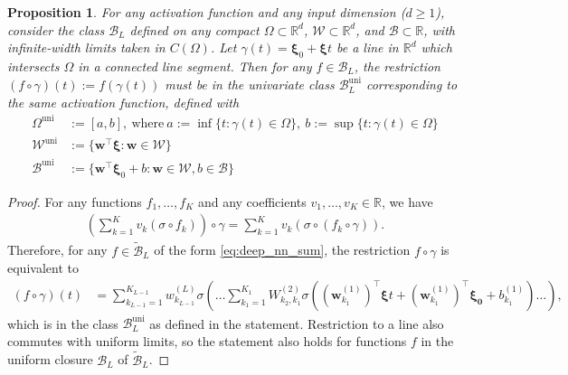 \documentclass[10pt,a4paper]{amsart}
\newtheorem{proposition}{Proposition}
\newcommand{\R}{\mathbb{R}}
\def\cB{{\mathcal{B}}}
\def\cW{{\mathcal{W}}}
\def\vw{{\bm{w}}}
\begin{document}
\begin{proposition} \label{prop:line_restriction}
    For any activation function and any input dimension ($d \geq 1$), consider the class $\cB_L$ defined on any compact $\Omega \subset \R^d$, $\cW \subset \R^d$, and $\cB \subset \R$, with infinite-width limits taken in $C(\Omega)$. Let $\gamma(t) = \boldsymbol{\xi}_0 + \boldsymbol{\xi} t$ be a line in $\R^d$ which intersects $\Omega$ in a connected line segment. Then for any $f \in \cB_L$, the restriction $(f \circ \gamma)(t) := f(\gamma(t))$ must be in the univariate class $\cB_L^{\mathrm{uni}}$ corresponding to the same activation function, defined with
    \begin{align}
        \Omega^{\mathrm{uni}} &:= [a,b], \  \mathrm{where} \ a := \inf\{ t: \gamma(t) \in \Omega \}, \ b := \sup \{ t: \gamma(t) \in \Omega \}  \\
        \cW^{\mathrm{uni}} &:= \{ \vw^\top \boldsymbol{\xi}: \vw \in \cW \} \\
        \cB^{\mathrm{uni}} &:= \{ \vw^\top \boldsymbol{\xi}_0+ b: \vw \in \cW, b \in \cB \}
    \end{align}
\end{proposition} 

\begin{proof}
    For any functions $f_1, \dots, f_K$ and any coefficients $v_1, \dots, v_K \in \R$, we have
    \begin{align} \label{eq:aconv_restrict}
        \left( \sum_{k=1}^K v_k (\sigma \circ f_k) \right) \circ \gamma = \sum_{k=1}^K v_k (\sigma \circ (f_k \circ \gamma)).
    \end{align}
    Therefore, for any $f \in \widetilde{\cB}_L$ of the form \eqref{eq:deep_nn_sum}, the restriction $f \circ \gamma$ is equivalent to
    \begin{align} \label{eq:deep_nn_sum_restricted}
        (f \circ \gamma)(t) &= \sum_{k_{L-1}=1}^{K_{L-1}} w_{k_{L-1}}^{(L)} \sigma \left(  \dots \sum_{k_1=1}^{K_1} W_{k_2, k_1}^{(2)} \sigma \left( ( \vw_{k_1}^{(1)} )^\top \boldsymbol{\xi} t + ( \vw_{k_1}^{(1)} )^\top \boldsymbol{\xi_0} + b_{k_1}^{(1)}  \right) \dots  \right),
    \end{align}
    which is in the class $\cB_L^{\mathrm{uni}}$ as defined in the statement. Restriction to a line also commutes with uniform limits, so the statement also holds for functions $f$ in the uniform closure $\cB_L$ of $\widetilde{\cB}_L$.
\end{proof}
\end{document}
